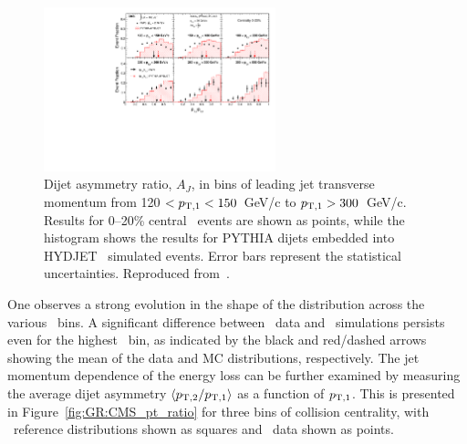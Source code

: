 \begin{figure}[!th]
\begin{center}
\includegraphics[width=0.6\textwidth]{jetfigures/dijet_imbalance5_0to20_pt_20120103_subt.pdf}
\caption{Dijet asymmetry ratio, $A_{J}$, in bins of leading jet transverse momentum from
120 $ < p_{\rm{T},1} < 150$~GeV/c to $p_{\rm{T},1} > 300$~GeV/c. 
Results for 0--20\% central \PbPb\ events are shown as points, while the histogram
shows the results for PYTHIA dijets embedded into HYDJET \PbPb\ simulated events. 
Error bars represent the statistical uncertainties.  Reproduced from~\cite{CMS_dijet}.}
\label{fig:GR:CMS_dijet_pt}
\end{center}
\end{figure}
One observes a strong evolution in the shape of the distribution across the
various \pT\ bins. A significant difference between \PbPb\ data and
\PYTHYD\ simulations persists even for the highest \pT\ bin, as indicated
by the black and red/dashed arrows showing the mean of the data and 
MC distributions, respectively.
The jet momentum dependence of the energy loss can be further examined by measuring the
average dijet asymmetry $\langle p_{\rm{T},2}/p_{\rm{T},1} \rangle$ as a function of $p_{\rm{T},1}$. 
This is presented in Figure~\ref{fig:GR:CMS_pt_ratio} for three bins of collision centrality, 
with \PYTHYD\ reference distributions shown as squares and \PbPb\ data shown as points.

